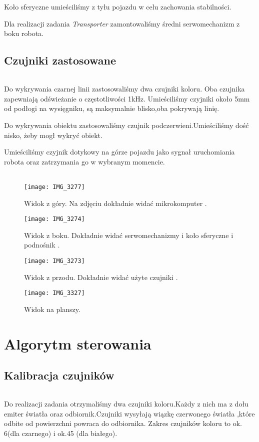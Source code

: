 \documentclass[12pt,a4paper]{report}
\begin{document}
Koło sferyczne umieściliśmy z tyłu pojazdu w celu zachowania stabilności.

 Dla realizacji zadania \textit{Transporter} zamontowaliśmy średni serwomechanizm z boku robota.
    
    \section{Czujniki zastosowane}
\subparagraph{}
Do wykrywania czarnej linii zastosowaliśmy dwa czujniki koloru. Oba czujnika zapewniają odświeżanie o częstotliwości 1kHz. Umieściliśmy czyjniki około 5mm od podłogi na wysięgniku, są maksymalnie blisko,oba pokrywają linię.

Do wykrywania obiektu zastosowaliśmy czujnik podczerwieni.Umieściliśmy dość nisko, żeby mogł wykryć obiekt.

Umieściliśmy czyjnik dotykowy na górze pojazdu jako sygnał uruchomiania robota oraz zatrzymania  go w wybranym momencie.  
	
	\subparagraph{}
	
	\begin{figure}
		\centering
		\texttt{[image: IMG\_3277]}
		\caption{Widok z góry. Na zdjęciu dokładnie widać mikrokomputer .}
		\label{fig:IMG_3277}
	\end{figure}
	
		\begin{figure}
		\centering
		\texttt{[image: IMG\_3274]}
		\caption{Widok z boku. Dokładnie widać serwomechanizmy i koło sferyczne i podnośnik .}
		\label{fig:IMG_3274}
	\end{figure}
	
		\begin{figure}
		\centering
		\texttt{[image: IMG\_3273]}
		\caption{Widok z przodu. Dokładnie widać użyte czujniki .}
		\label{fig:IMG_3273}
	\end{figure}	
	
		\begin{figure}
		\centering
		\texttt{[image: IMG\_3327]}
		\caption{Widok na planszy.}
		\label{fig:IMG_3327}
	\end{figure}	
	
    	\chapter{Algorytm sterowania}
    	\section{Kalibracja czujników}
    	\subparagraph{}
    	Do realizacji zadania otrzymaliśmy dwa czujniki koloru.Każdy z nich ma z dołu emiter światła oraz odbiornik.Czujniki wysyłają wiązkę czerwonego światła ,które odbite od powierzchni powraca do odbiornika. Zakres czujników koloru to ok. 6(dla czarnego) i ok.45 (dla białego).
    
\end{document}
